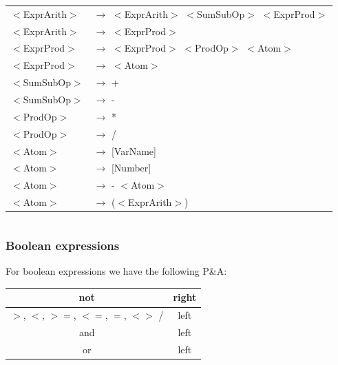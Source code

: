 \documentclass[letterpaper]{article}
\begin{document}
    \begin{center}
            \begin{tabular}{l l}
                $<$ExprArith$>$ &$\rightarrow$ $<$ExprArith$>$ $<$SumSubOp$>$ $<$ExprProd$>$ \\
                $<$ExprArith$>$ &$\rightarrow$ $<$ExprProd$>$ \\
                $<$ExprProd$>$ &$\rightarrow$ $<$ExprProd$>$ $<$ProdOp$>$ $<$Atom$>$ \\
                $<$ExprProd$>$ &$\rightarrow$ $<$Atom$>$ \\

                $<$SumSubOp$>$ &$\rightarrow$ + \\
                $<$SumSubOp$>$ &$\rightarrow$ - \\

                $<$ProdOp$>$ &$\rightarrow$ * \\
                $<$ProdOp$>$ &$\rightarrow$ / \\

                $<$Atom$>$ &$\rightarrow$ [VarName] \\
                $<$Atom$>$ &$\rightarrow$ [Number] \\
                $<$Atom$>$ &$\rightarrow$ - $<$Atom$>$ \\
                $<$Atom$>$ &$\rightarrow$ ($<$ExprArith$>$) \\

            \end{tabular}
    \end{center}


\begin{lstlisting}
\end{lstlisting}


\subsubsection{Boolean expressions}

For boolean expressions we have the following P\&A:


\begin{tabular}{|c|c|}
    \hline
    not & right \\
    \hline
    $>$, $<$, $>=$, $<=$, $=$, $<>$ / & left \\
    \hline
    and & left \\
    \hline
    or & left \\
    \hline
\end{tabular}
\end{document}
